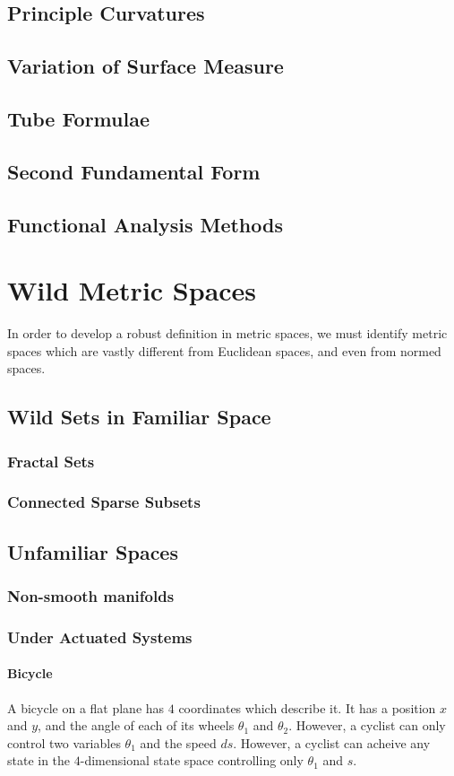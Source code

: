 \documentclass{article}
\theoremstyle{definition}
\theoremstyle{definition}
\theoremstyle{plain}
\renewcommand{\(}{\left(}
\renewcommand{\)}{\right)}
\begin{document}
\subsection{Principle Curvatures}
\subsection{Variation of Surface Measure}
\subsection{Tube Formulae}
\subsection{Second Fundamental Form}
\subsection{Functional Analysis Methods}

\section{Wild Metric Spaces}
In order to develop a robust definition in metric spaces, we must identify metric spaces which are vastly different from Euclidean spaces, and even from normed spaces.  

\subsection{Wild Sets in Familiar Space}
\subsubsection*{Fractal Sets}
\subsubsection*{Connected Sparse Subsets}

\subsection{Unfamiliar Spaces}
\subsubsection*{Non-smooth manifolds}
\subsubsection*{Under Actuated Systems}
\paragraph{Bicycle}
A bicycle on a flat plane has $4$ coordinates which describe it.  It has a position $x$ and $y$, and the angle of each of its wheels $\theta_1$ and $\theta_2$.  However, a cyclist can only control two variables $\theta_1$ and the speed $ds$.  However, a cyclist can acheive any state in the $4$-dimensional state space controlling only $\theta_1$ and $s$.
\end{document}
